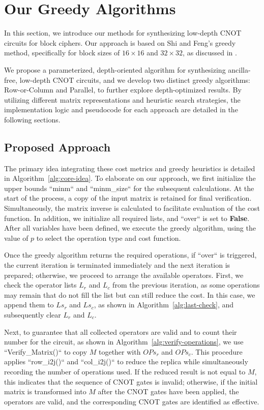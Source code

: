 \chapter{Our Greedy Algorithms}
\label{ch:our-algorithms}
In this section, we introduce our methods for synthesizing low-depth CNOT circuits for block ciphers. Our approach is based on Shi and Feng's greedy method, specifically for block sizes of $16 \times 16$ and $32 \times 32$, as discussed in \cite{cryptoeprint:2023/165}.

We propose a parameterized, depth-oriented algorithm for synthesizing ancilla-free, low-depth CNOT circuits, and we develop two distinct greedy algorithms: Row-or-Column and Parallel, to further explore depth-optimized results. By utilizing different matrix representations and heuristic search strategies, the implementation logic and pseudocode for each approach are detailed in the following sections.

\section{Proposed Approach}

The primary idea integrating these cost metrics and greedy heuristics 
is detailed in Algorithm~\ref{alg:core-idea}. To elaborate on our approach, 
we first initialize the upper bounds ``minm`` and ``minm\_size`` 
for the subsequent calculations. At the start of the process, a copy of 
the input matrix is retained for final verification. Simultaneously, the 
matrix inverse is calculated to facilitate evaluation of the cost function. 
In addition, we initialize all required lists, and ``over`` is set to 
\textbf{False}. After all variables have been defined, we execute the 
greedy algorithm, using the value of $p$ to select the operation type and 
cost function.

Once the greedy algorithm returns the required operations, if ``over`` 
is triggered, the current iteration is terminated immediately and the next 
iteration is prepared; otherwise, we proceed to arrange the available 
operators. First, we check the operator lists $L_{r}$ and $L_{c}$ from the 
previous iteration, as some operations may remain that do not fill the 
list but can still reduce the cost. In this case, we append them to 
$Ls_{r}$ and $Ls_{c}$, as shown in Algorithm~\ref{alg:last-check}, and 
subsequently clear $L_{r}$ and $L_{c}$.

Next, to guarantee that all collected operators are valid and to count 
their number for the circuit, as shown in Algorithm~\ref{alg:verify-operations}, 
we use ``Verify\_Matrix()`` to copy $M$ together with $OPs_{r}$ and 
$OPs_{c}$. This procedure applies ``row\_i2j()`` and ``col\_i2j()`` 
to reduce the replica while simultaneously recording the number of 
operations used. If the reduced result is not equal to $M$, this indicates that the
sequence of CNOT gates is invalid; otherwise, if the initial matrix is
transformed into $M$ after the CNOT gates have been applied, the
operators are valid, and the corresponding CNOT gates are identified as
effective.

